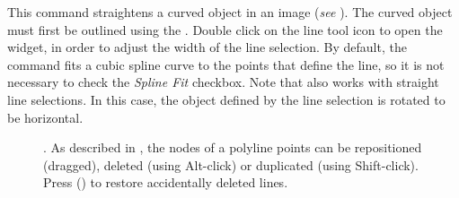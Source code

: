 This command straightens a curved object in an
image (\emph{see} ). The
curved object must first be outlined using the .
Double click on the line tool icon to open the 
widget, in order to adjust the width of the line selection. By default,
the  command fits a cubic spline
curve to the points that define the line, so it is not necessary to
check the \emph{Spline Fit} checkbox. Note that 
also works with straight line selections. In this case, the object
defined by the line selection is rotated to be horizontal.
\begin{figure}[h]
\caption[Straightening filamentous objects]{\textbf{\label{fig:Straighten}}\protect{}.
As described in , the nodes
of a polyline points can be repositioned (dragged), deleted (using
Alt-click) or duplicated (using Shift-click). Press \protect{}
\protect{} (\protect{})
to restore accidentally deleted lines.}
\end{figure}





\subsubsection{\protect{}\label{sub:To-Bounding-Box}}

